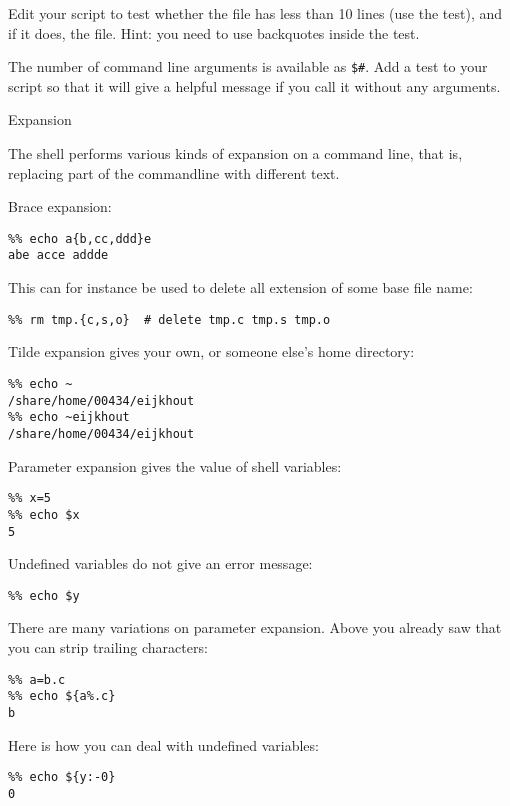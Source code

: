Edit your script to test whether the file has less than 10 lines
(use the  test), and if it does,  the
file. Hint: you need to use backquotes inside the test.

The number of command line arguments is available as \verb+$#+. Add a
test to your script so that it will give a helpful message if you call
it without any arguments.

 {Expansion}
\label{tut:unix-expansion}

The shell performs various kinds of expansion on a command line, that
is, replacing part of the commandline with different text.

Brace expansion:
\begin{verbatim}
%% echo a{b,cc,ddd}e
abe acce addde
\end{verbatim}
This can for instance be used to delete all extension of some base
file name:
\begin{verbatim}
%% rm tmp.{c,s,o}  # delete tmp.c tmp.s tmp.o
\end{verbatim}

Tilde expansion gives your own, or someone else's home directory:
\begin{verbatim}
%% echo ~
/share/home/00434/eijkhout
%% echo ~eijkhout
/share/home/00434/eijkhout
\end{verbatim}

Parameter expansion gives the value of shell variables:
\begin{verbatim}
%% x=5
%% echo $x
5
\end{verbatim}
Undefined variables do not give an error message:
\begin{verbatim}
%% echo $y
\end{verbatim}
There are many variations on parameter expansion. Above you already
saw that you can strip trailing characters:
\begin{verbatim}
%% a=b.c
%% echo ${a%.c}
b
\end{verbatim}
Here is how you can deal with undefined variables:
\begin{verbatim}
%% echo ${y:-0}
0
\end{verbatim}

\begin{comment}
There are ways of doing pattern matching and substitution 
on a variable:
\begin{verbatim}
%% f=x.fort
%% echo ${f%%.fort}
x
%% echo ${f%%.fort}.bak
x.bak
\end{verbatim}
\end{comment}

